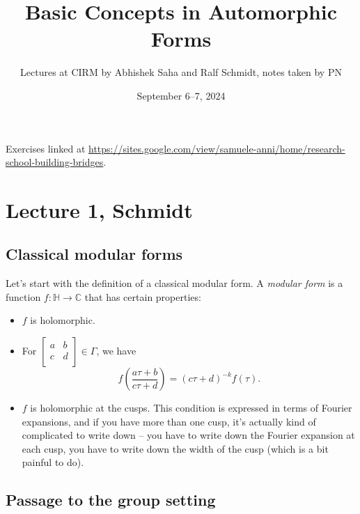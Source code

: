 \documentclass[reqno]{amsart} 
\begin{document}
\title{Basic Concepts in Automorphic Forms}

\author{Lectures at CIRM by Abhishek Saha and Ralf Schmidt, notes taken by PN}

\date{September 6--7, 2024}

\maketitle

Exercises linked at \url{https://sites.google.com/view/samuele-anni/home/research-school-building-bridges}.

\section{Lecture 1, Schmidt}

\subsection{Classical modular forms}

Let's start with the definition of a classical modular form.  A \emph{modular form} is a function $f : \mathbb{H} \rightarrow \mathbb{C}$ that has certain properties:
\begin{itemize}
\item $f$ is holomorphic.
\item For $
  \begin{bmatrix}
    a    & b \\
    c & d \\
  \end{bmatrix} \in \Gamma$, we have
  \begin{equation}\label{eq:cnog0kttte}
    f\left( \frac{a \tau + b}{c \tau + d}\right)
    =(c \tau + d)^{- k}
    f(\tau).    
  \end{equation}
\item $f$ is holomorphic at the cusps.  This condition is expressed in terms of Fourier expansions, and if you have more than one cusp, it's actually kind of complicated to write down -- you have to write down the Fourier expansion at each cusp, you have to write down the width of the cusp (which is a bit painful to do).
\end{itemize}

\subsection{Passage to the group setting}
\end{document}
